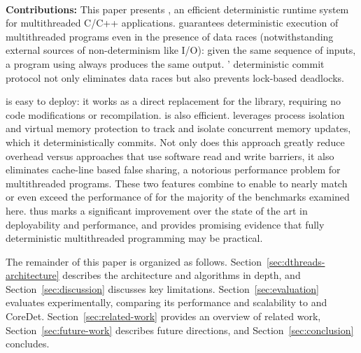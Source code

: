 \hspace{1em} \\
\noindent
\textbf{Contributions:}
This paper presents \textbf{\dthreads{}}, an efficient deterministic runtime
system for multithreaded C/C++ applications. \dthreads{} guarantees
deterministic execution of multithreaded programs even in the presence
of data races (notwithstanding external sources of non-determinism
like I/O): given the same sequence of inputs, a program
using \dthreads{} always produces the same output. \dthreads{}'
deterministic commit protocol not only eliminates data races but also
prevents lock-based deadlocks.

\dthreads{} is easy to deploy: it works as a direct replacement for
the \pthreads{} library, requiring no code modifications or
recompilation. \dthreads{} is also efficient. \dthreads{} leverages
process isolation and virtual memory protection to track and isolate
concurrent memory updates, which it deterministically commits. Not
only does this approach greatly reduce overhead versus approaches that
use software read and write barriers, it also eliminates cache-line
based false sharing, a notorious performance problem for multithreaded
programs. These two features combine to enable \dthreads{} to nearly
match or even exceed the performance of \pthreads{} for the majority
of the benchmarks examined here. \dthreads{} thus marks a significant
improvement over the state of the art in deployability and
performance, and provides promising evidence that fully deterministic
multithreaded programming may be practical.





The remainder of this paper is organized as
follows. Section~\ref{sec:dthreads-architecture} describes
the \dthreads{} architecture and algorithms in depth, and
Section~\ref{sec:discussion} discusses key
limitations. Section~\ref{sec:evaluation} evaluates \dthreads{}
experimentally, comparing its performance and scalability
to \pthreads{} and CoreDet. Section~\ref{sec:related-work} provides an
overview of related work, Section~\ref{sec:future-work} describes
future directions, and Section~\ref{sec:conclusion} concludes.
